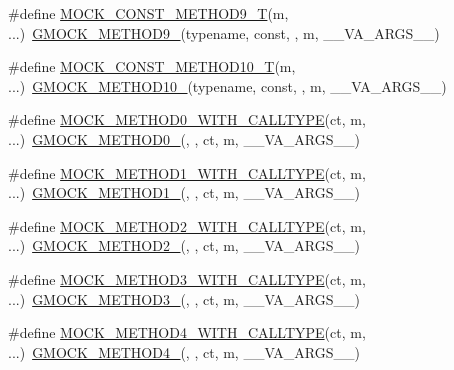 \begin{DoxyCompactItemize}
\item 
\#define \hyperlink{gmock-generated-function-mockers_8h_a7875d0d77516825a4b9cee703ae85c6f}{M\+O\+C\+K\+\_\+\+C\+O\+N\+S\+T\+\_\+\+M\+E\+T\+H\+O\+D9\+\_\+T}(m, ...)~\hyperlink{gmock-generated-function-mockers_8h_aa820171a19cc587c247dbe05cbffc55f}{G\+M\+O\+C\+K\+\_\+\+M\+E\+T\+H\+O\+D9\+\_\+}(typename, const, , m, \+\_\+\+\_\+\+V\+A\+\_\+\+A\+R\+G\+S\+\_\+\+\_\+)
\item 
\#define \hyperlink{gmock-generated-function-mockers_8h_aa31d758cb898bad2d16ac706c204da7f}{M\+O\+C\+K\+\_\+\+C\+O\+N\+S\+T\+\_\+\+M\+E\+T\+H\+O\+D10\+\_\+T}(m, ...)~\hyperlink{gmock-generated-function-mockers_8h_a81a48223a8771de36ef92ac6d56f6e81}{G\+M\+O\+C\+K\+\_\+\+M\+E\+T\+H\+O\+D10\+\_\+}(typename, const, , m, \+\_\+\+\_\+\+V\+A\+\_\+\+A\+R\+G\+S\+\_\+\+\_\+)
\item 
\#define \hyperlink{gmock-generated-function-mockers_8h_acedf2c97e3493f4f39d35bbead8d9e4a}{M\+O\+C\+K\+\_\+\+M\+E\+T\+H\+O\+D0\+\_\+\+W\+I\+T\+H\+\_\+\+C\+A\+L\+L\+T\+Y\+PE}(ct,  m, ...)~\hyperlink{gmock-generated-function-mockers_8h_ae0d290ffa58d7c624b2e3487ba1252f4}{G\+M\+O\+C\+K\+\_\+\+M\+E\+T\+H\+O\+D0\+\_\+}(, , ct, m, \+\_\+\+\_\+\+V\+A\+\_\+\+A\+R\+G\+S\+\_\+\+\_\+)
\item 
\#define \hyperlink{gmock-generated-function-mockers_8h_a3ffee4ba10588254eb44e67603e9de71}{M\+O\+C\+K\+\_\+\+M\+E\+T\+H\+O\+D1\+\_\+\+W\+I\+T\+H\+\_\+\+C\+A\+L\+L\+T\+Y\+PE}(ct,  m, ...)~\hyperlink{gmock-generated-function-mockers_8h_a1bc0012d62440dda77208dabdf4925c9}{G\+M\+O\+C\+K\+\_\+\+M\+E\+T\+H\+O\+D1\+\_\+}(, , ct, m, \+\_\+\+\_\+\+V\+A\+\_\+\+A\+R\+G\+S\+\_\+\+\_\+)
\item 
\#define \hyperlink{gmock-generated-function-mockers_8h_a27fcf1de830388291c2a81b144b8f89b}{M\+O\+C\+K\+\_\+\+M\+E\+T\+H\+O\+D2\+\_\+\+W\+I\+T\+H\+\_\+\+C\+A\+L\+L\+T\+Y\+PE}(ct,  m, ...)~\hyperlink{gmock-generated-function-mockers_8h_a885295ca6bebb15efb3fc786218c5d47}{G\+M\+O\+C\+K\+\_\+\+M\+E\+T\+H\+O\+D2\+\_\+}(, , ct, m, \+\_\+\+\_\+\+V\+A\+\_\+\+A\+R\+G\+S\+\_\+\+\_\+)
\item 
\#define \hyperlink{gmock-generated-function-mockers_8h_afef2985a236f7588139c690d395758fb}{M\+O\+C\+K\+\_\+\+M\+E\+T\+H\+O\+D3\+\_\+\+W\+I\+T\+H\+\_\+\+C\+A\+L\+L\+T\+Y\+PE}(ct,  m, ...)~\hyperlink{gmock-generated-function-mockers_8h_af7c77ba511c631de02bb8c45a6ed3045}{G\+M\+O\+C\+K\+\_\+\+M\+E\+T\+H\+O\+D3\+\_\+}(, , ct, m, \+\_\+\+\_\+\+V\+A\+\_\+\+A\+R\+G\+S\+\_\+\+\_\+)
\item 
\#define \hyperlink{gmock-generated-function-mockers_8h_a333774e6dda450fc85c241bff4b9957a}{M\+O\+C\+K\+\_\+\+M\+E\+T\+H\+O\+D4\+\_\+\+W\+I\+T\+H\+\_\+\+C\+A\+L\+L\+T\+Y\+PE}(ct,  m, ...)~\hyperlink{gmock-generated-function-mockers_8h_ab6430f2cfad9de4aca5258ea559294bb}{G\+M\+O\+C\+K\+\_\+\+M\+E\+T\+H\+O\+D4\+\_\+}(, , ct, m, \+\_\+\+\_\+\+V\+A\+\_\+\+A\+R\+G\+S\+\_\+\+\_\+)

\end{DoxyCompactItemize}
